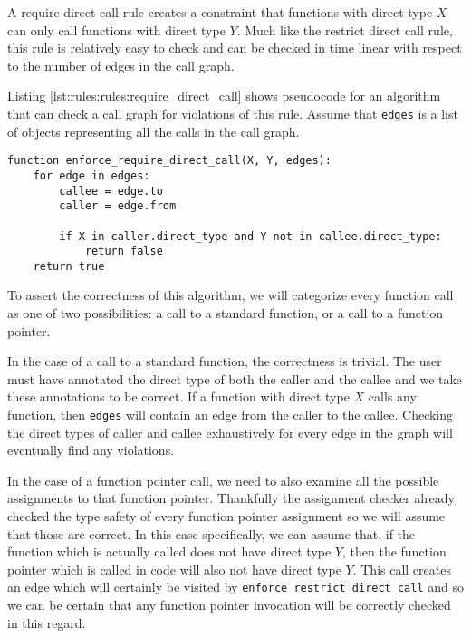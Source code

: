 A require direct call rule creates a constraint that functions with direct type $X$ can only call functions with direct type $Y$. Much like the restrict direct call rule, this rule is relatively easy to check and can be checked in time linear with respect to the number of edges in the call graph.

Listing \ref{lst:rules:rules:require_direct_call} shows pseudocode for an algorithm that can check a call graph for violations of this rule.  Assume that \lstinline{edges} is a list of objects representing all the calls in the call graph.  

\noindent\begin{minipage}[t]{\linewidth}
\begin{lstlisting}[caption={Pseudocode for an algorithm that can check a $require\_direct\_call$ constraint.  This algorithm returns \lstinline{true} if the call graph respects the constraint and \lstinline{false} if the call graph violates it.},label={lst:rules:rules:require_direct_call}]
function enforce_require_direct_call(X, Y, edges):
    for edge in edges:
        callee = edge.to
        caller = edge.from

        if X in caller.direct_type and Y not in callee.direct_type:
            return false
    return true
\end{lstlisting}
\end{minipage}

To assert the correctness of this algorithm, we will categorize every function call as one of two possibilities: a call to a standard function, or a call to a function pointer.

In the case of a call to a standard function, the correctness is trivial.  The user must have annotated the direct type of both the caller and the callee and we take these annotations to be correct.  If a function with direct type $X$ calls any function, then \lstinline{edges} will contain an edge from the caller to the callee.  Checking the direct types of caller and callee exhaustively for every edge in the graph will eventually find any violations.

In the case of a function pointer call, we need to also examine all the possible assignments to that function pointer.  Thankfully the assignment checker already checked the type safety of every function pointer assignment so we will assume that those are correct.  In this case specifically, we can assume that, if the function which is actually called does not have direct type $Y$, then the function pointer which is called in code will also not have direct type $Y$.  This call creates an edge which will certainly be visited by \lstinline{enforce_restrict_direct_call} and so we can be certain that any function pointer invocation will be correctly checked in this regard.


